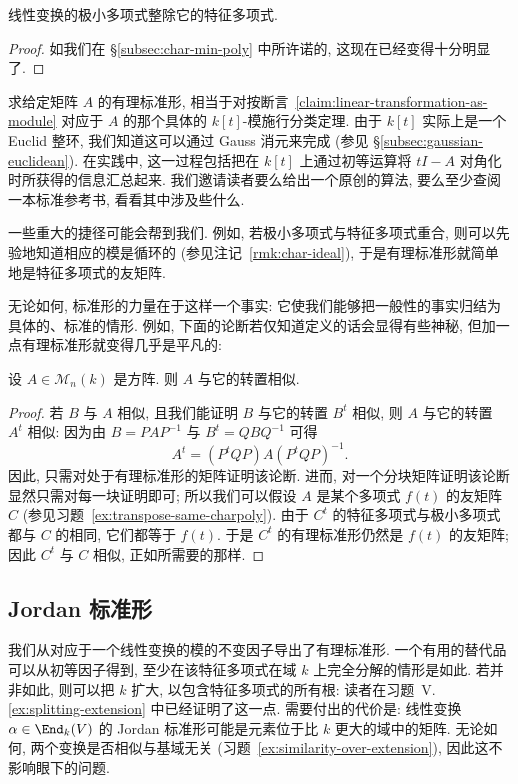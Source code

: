 \begin{corollary}\label{cor:minpoly-divides-charpoly}
线性变换的极小多项式整除它的特征多项式.
\end{corollary}

\begin{proof}
如我们在 §\ref{subsec:char-min-poly} 中所许诺的, 这现在已经变得十分明显了.
\end{proof}

求给定矩阵 $A$ 的有理标准形, 相当于对按断言~\ref{claim:linear-transformation-as-module} 对应于 $A$ 的那个具体的 $k[t]$-模施行分类定理. 由于 $k[t]$ 实际上是一个 Euclid 整环, 我们知道这可以通过 Gauss 消元来完成 (参见 §\ref{subsec:gaussian-euclidean}). 在实践中, 这一过程包括把在 $k[t]$ 上通过初等运算将 $tI-A$ 对角化时所获得的信息汇总起来. 我们邀请读者要么给出一个原创的算法, 要么至少查阅一本标准参考书, 看看其中涉及些什么.

一些重大的捷径可能会帮到我们. 例如, 若极小多项式与特征多项式重合, 则可以先验地知道相应的模是循环的 (参见注记~\ref{rmk:char-ideal}), 于是有理标准形就简单地是特征多项式的友矩阵.

无论如何, 标准形的力量在于这样一个事实: 它使我们能够把一般性的事实归结为具体的、标准的情形. 例如, 下面的论断若仅知道定义的话会显得有些神秘, 但加一点有理标准形就变得几乎是平凡的:

\begin{proposition}\label{prop:similar-to-transpose}
设 $A\in\mathcal{M}_n(k)$ 是方阵. 则 $A$ 与它的转置相似.
\end{proposition}

\begin{proof}
若 $B$ 与 $A$ 相似, 且我们能证明 $B$ 与它的转置 $B^t$ 相似, 则 $A$ 与它的转置 $A^t$ 相似: 因为由 $B=PAP^{-1}$ 与 $B^t=QBQ^{-1}$ 可得
\[
A^t=(P^tQP)A(P^tQP)^{-1}.
\]
因此, 只需对处于有理标准形的矩阵证明该论断. 进而, 对一个分块矩阵证明该论断显然只需对每一块证明即可; 所以我们可以假设 $A$ 是某个多项式 $f(t)$ 的友矩阵 $C$ (参见习题~\ref{ex:transpose-same-charpoly}). 由于 $C^t$ 的特征多项式与极小多项式都与 $C$ 的相同, 它们都等于 $f(t)$. 于是 $C^t$ 的有理标准形仍然是 $f(t)$ 的友矩阵; 因此 $C^t$ 与 $C$ 相似, 正如所需要的那样.
\end{proof}

\subsection{Jordan 标准形}
\label{subsec:jordan-canonical}

我们从对应于一个线性变换的模的不变因子导出了有理标准形. 一个有用的替代品可以从初等因子得到, 至少在该特征多项式在域 $k$ 上完全分解的情形是如此. 若并非如此, 则可以把 $k$ 扩大, 以包含特征多项式的所有根: 读者在习题~V.\ref{ex:splitting-extension} 中已经证明了这一点. 需要付出的代价是: 线性变换 $\alpha\in\End_k(V)$ 的 Jordan 标准形可能是元素位于比 $k$ 更大的域中的矩阵. 无论如何, 两个变换是否相似与基域无关 (习题~\ref{ex:similarity-over-extension}), 因此这不影响眼下的问题.


